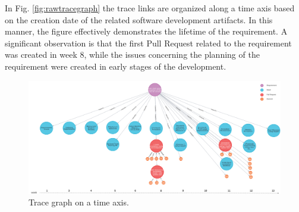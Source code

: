 \documentclass[conference]{IEEEtran}
\begin{document}
In Fig. \ref{fig:rawtracegraph} the trace links are organized along a time axis based on the creation date of the related software development artifacts. In this manner, the figure effectively demonstrates the lifetime of the requirement. A significant observation is that the first Pull Request related to the requirement was created in week 8, while the issues concerning the planning of the requirement were created in early stages of the development.


\begin{figure}[htb]
    \centering
    \includegraphics[width=0.85\linewidth]{figs/traceGraph.png}
    \caption{Trace graph on a time axis.}
    \label{fig:tracegraph}
\end{figure}







\end{document}
